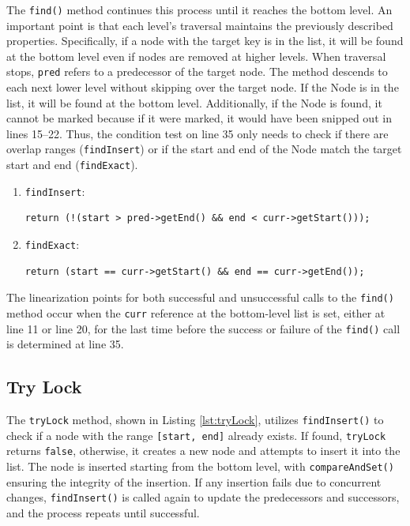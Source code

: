 The \texttt{find()} method continues this process until it reaches the bottom level.
An important point is that each level's traversal maintains the previously described properties.
Specifically, if a node with the target key is in the list, it will be found at the bottom level even if nodes are removed at higher levels.
When traversal stops, \texttt{pred} refers to a predecessor of the target node.
The method descends to each next lower level without skipping over the target node.
If the Node is in the list, it will be found at the bottom level.
Additionally, if the Node is found, it cannot be marked because if it were marked, it would have been snipped out in lines 15--22.
Thus, the condition test on line 35 only needs to check if there are overlap ranges (\texttt{findInsert}) or if the start and end of the Node match the target start and end (\texttt{findExact}).
\begin{enumerate}
    \item \texttt{findInsert}:
    \begin{lstlisting}[style=nonum, label={}]
    return (!(start > pred->getEnd() && end < curr->getStart()));
    \end{lstlisting}
    \item \texttt{findExact}:
    \begin{lstlisting}[style=nonum, label={}]
    return (start == curr->getStart() && end == curr->getEnd());
    \end{lstlisting}
\end{enumerate}

The linearization points for both successful and unsuccessful calls to the \texttt{find()} method occur when the \texttt{curr} reference at the bottom-level list is set, either at line 11 or line 20, for the last time before the success or failure of the \texttt{find()} call is determined at line 35.

\clearpage

\subsection{Try Lock}\label{subsec:tryLock}

The \texttt{tryLock} method, shown in Listing \ref{lst:tryLock}, utilizes \texttt{findInsert()} to check if a node with the range \texttt{[start, end]} already exists. If found, \texttt{tryLock} returns \texttt{false}, otherwise, it creates a new node and attempts to insert it into the list. The node is inserted starting from the bottom level, with \texttt{compareAndSet()} ensuring the integrity of the insertion. If any insertion fails due to concurrent changes, \texttt{findInsert()} is called again to update the predecessors and successors, and the process repeats until successful.


